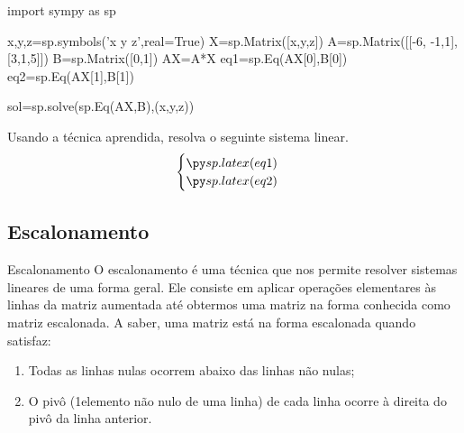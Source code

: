 \begin{frame}[label=sistemas,fragile=singleslide]
\begin{pycode}
import sympy as sp

x,y,z=sp.symbols('x y z',real=True)
X=sp.Matrix([x,y,z])
A=sp.Matrix([[-6, -1,1],[3,1,5]])
B=sp.Matrix([0,1])
AX=A*X
eq1=sp.Eq(AX[0],B[0])
eq2=sp.Eq(AX[1],B[1])

sol=sp.solve(sp.Eq(AX,B),(x,y,z))

\end{pycode}

\begin{casa}
Usando a técnica aprendida, resolva o seguinte sistema linear.
\[\begin{cases}
\pyl{eq1}\\
\pyl{eq2}
\end{cases}\]
\end{casa}

\end{frame}

\subsection*{Escalonamento}

\begin{frame}[label=sistemas]{Escalonamento}
O {\color{blue} escalonamento} é uma técnica que nos permite resolver sistemas lineares de uma forma geral. Ele consiste em aplicar operações elementares às linhas da matriz aumentada até obtermos uma matriz na forma conhecida como {\color{blue} matriz escalonada}. A saber, uma matriz está na forma {\color{blue}escalonada} quando satisfaz:
\begin{block}{}
\begin{enumerate}
\item Todas as linhas nulas ocorrem abaixo das linhas não nulas;
\item O {\color{blue} pivô} (1\mc elemento não nulo de uma linha) de cada linha ocorre à direita do pivô da linha anterior.
\end{enumerate}
\end{block}



\end{frame}

